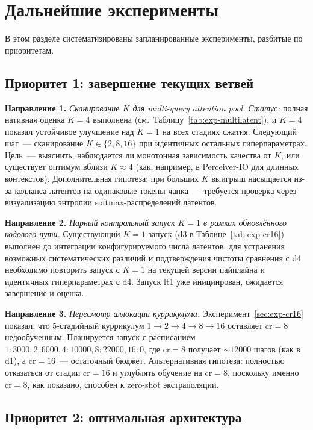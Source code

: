 \documentclass[a4paper,12pt]{extarticle}
\begin{document}
\section{Дальнейшие эксперименты}\label{sec:future}

В этом разделе систематизированы запланированные эксперименты, разбитые по приоритетам.

\subsection{Приоритет 1: завершение текущих ветвей}

\textbf{Направление 1.}\label{todo:lt4-eval} \emph{Сканирование $K$ для multi-query attention pool.}\quad
\emph{Статус:} полная нативная оценка $K=4$ выполнена (см.~Таблицу~\ref{tab:exp-multilatent}), и $K=4$ показал устойчивое улучшение над $K=1$ на всех стадиях сжатия. Следующий шаг~--- сканирование $K \in \{2, 8, 16\}$ при идентичных остальных гиперпараметрах. Цель~--- выяснить, наблюдается ли монотонная зависимость качества от $K$, или существует оптимум вблизи $K \approx 4$ (как, например, в Perceiver-IO для длинных контекстов). Дополнительная гипотеза: при больших $K$ выигрыш насыщается из-за коллапса латентов на одинаковые токены чанка~--- требуется проверка через визуализацию энтропии softmax-распределений латентов.

\textbf{Направление 2.} \emph{Парный контрольный запуск $K=1$ в рамках обновлённого кодового пути.}
Существующий $K=1$-запуск (d3 в Таблице~\ref{tab:exp-cr16}) выполнен до интеграции конфигурируемого числа латентов; для устранения возможных систематических различий и подтверждения чистоты сравнения с d4 необходимо повторить запуск с $K=1$ на текущей версии пайплайна и идентичных гиперпараметрах с d4. Запуск lt1 уже инициирован, ожидается завершение и оценка.

\textbf{Направление 3.}\label{todo:reschedule} \emph{Пересмотр аллокации куррикулума.}
Эксперимент~\ref{sec:exp-cr16} показал, что 5-стадийный куррикулум $1 \to 2 \to 4 \to 8 \to 16$ оставляет $\text{cr}=8$ недообученным. Планируется запуск с расписанием $1{:}3000, 2{:}6000, 4{:}10000, 8{:}22000, 16{:}0$, где $\text{cr}=8$ получает $\sim 12000$ шагов (как в d1), а $\text{cr}=16$~--- остаточный бюджет. Альтернативная гипотеза: полностью отказаться от стадии $\text{cr}=16$ и углублять обучение на $\text{cr}=8$, поскольку именно $\text{cr}=8$, как показано, способен к zero-shot экстраполяции.

\subsection{Приоритет 2: оптимальная архитектура}
\end{document}
